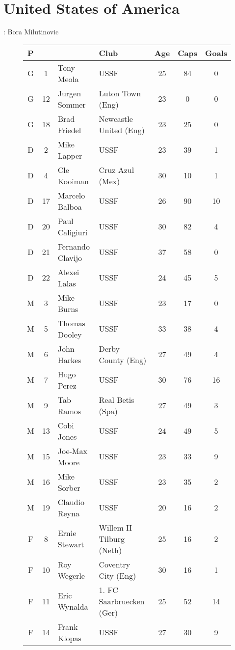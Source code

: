 \chapter{United States of America}
\newline
\newline
\Coach: Bora Milutinovic
\begin{figure}[H]
\begin{tabular}{c c l l c c c}
P & & & Club & Age & Caps & Goals \\ \hline
G & 1 & Tony Meola & USSF & 25 & 84 & 0 \\
G & 12 & Jurgen Sommer & Luton Town (Eng) & 23 & 0 & 0 \\
G & 18 & Brad Friedel & Newcastle United (Eng) & 23 & 25 & 0 \\ \hline
D & 2 & Mike Lapper & USSF & 23 & 39 & 1 \\
D & 4 & Cle Kooiman & Cruz Azul (Mex) & 30 & 10 & 1 \\
D & 17 & Marcelo Balboa & USSF & 26 & 90 & 10 \\
D & 20 & Paul Caligiuri & USSF & 30 & 82 & 4 \\
D & 21 & Fernando Clavijo & USSF & 37 & 58 & 0 \\
D & 22 & Alexei Lalas & USSF & 24 & 45 & 5 \\ \hline
M & 3 & Mike Burns & USSF & 23 & 17 & 0 \\
M & 5 &Thomas Dooley & USSF & 33 & 38 & 4 \\
M & 6 & John Harkes & Derby County (Eng) & 27 & 49 & 4 \\
M & 7 & Hugo Perez & USSF & 30 & 76 & 16 \\
M & 9 & Tab Ramos & Real Betis (Spa) & 27 & 49 & 3 \\
M & 13 & Cobi Jones & USSF & 24 & 49 & 5 \\
M & 15 & Joe-Max Moore & USSF & 23 & 33 & 9 \\
M & 16 & Mike Sorber & USSF & 23 & 35 & 2 \\
M & 19 & Claudio Reyna & USSF & 20 & 16 & 2 \\ \hline
F & 8 & Ernie Stewart & Willem II Tilburg (Neth) & 25 & 16 & 2 \\
F & 10 & Roy Wegerle & Coventry City (Eng) & 30 & 16 & 1 \\
F & 11 & Eric Wynalda & 1. FC Saarbruecken (Ger) & 25 & 52 & 14 \\
F & 14 & Frank Klopas & USSF & 27 & 30 & 9 \\ \hline
\end{tabular}
\end{figure}
